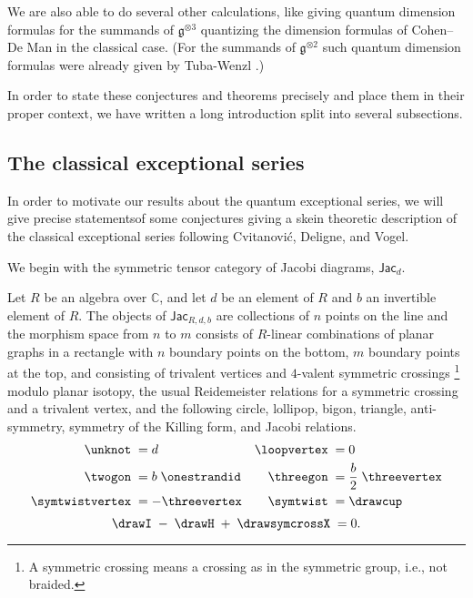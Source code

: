 \documentclass[12pt]{amsart}
\begin{document}
We are also able to do several other calculations, like giving quantum
dimension formulas for the summands of $\mathfrak{g}^{\otimes 3}$ quantizing
the dimension formulas of Cohen--De Man \cite{MR1381778} in the classical case.
(For the summands of $\mathfrak{g}^{\otimes 2}$ such quantum dimension
formulas were already given by Tuba-Wenzl \cite{MR2132671}.)

In order to state these conjectures and theorems precisely and place them in
their proper context, we have written a  long introduction split into several
subsections.

\subsection{The classical exceptional series}
\label{sec:intro-classical}
In order to motivate our results about the quantum exceptional series, we will
give precise statementsof some conjectures giving a skein theoretic
description of the classical exceptional series following Cvitanović, Deligne,
and Vogel.

We begin with the symmetric tensor category of Jacobi
diagrams, $\mathsf{Jac}_d$.

\begin{definition}
Let $R$ be an algebra over $\mathbb{C}$, and let $d$ be an element of $R$ and
$b$ an invertible element of $R$.  The objects of $\mathsf{Jac}_{R,d,b}$ are
collections of $n$ points on the line and the morphism space from $n$ to $m$
consists of $R$-linear combinations of planar graphs in a rectangle with $n$
boundary points on the bottom, $m$ boundary points at the top, and consisting
of trivalent vertices and $4$-valent symmetric crossings%
\footnote{A symmetric crossing means a crossing as in the symmetric
  group, i.e., not braided.}
modulo planar isotopy, the usual Reidemeister relations
for a symmetric crossing and a trivalent vertex, and the following
circle, lollipop, bigon,
triangle, anti-symmetry, symmetry of the Killing form, and Jacobi relations.
\begin{align}
\label{eq:classical-loop-lollipop}  \unknot \; &= d &  \loopvertex \; &=0 \\
\label{eq:classical-bigon-trigon}  \twogon\; &= b \;\onestrandid  & \threegon\; &= \frac{b}{2} \;\threevertex \\
\label{eq:classical-symmetry-antisymmetry}   \symtwistvertex\; &= - \threevertex & \symtwist\; &= \drawcup
\end{align}
\begin{equation}
\drawI\; - \;\drawH\; + \;\drawsymcrossX\; = 0.
\label{eq:IHX}
\end{equation}
\end{definition}
\end{document}
